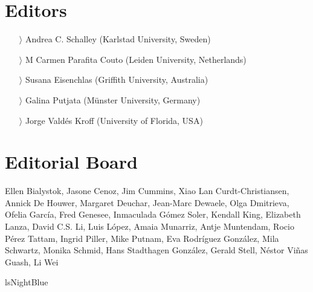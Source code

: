 \documentclass[
notumble,
nofoldmark,
]{leaflet}
\begin{document}
 \color{lsNightBlue} 
{
\section{Editors}    
            
            
\begin{itemize}
    \item[$\rangle$] Andrea C. Schalley (Karlstad University, Sweden) 
    \item[$\rangle$] M Carmen Parafita Couto   (Leiden University, Netherlands) 
    \item[$\rangle$]Susana Eisenchlas (Griffith University, Australia)
    \item[$\rangle$]Galina Putjata (Münster University, Germany)
    \item[$\rangle$]Jorge Valdés Kroff (University of Florida, USA)
\end{itemize}
    \section{Editorial Board}    
\raggedright         
    Ellen Bialystok,
    Jasone Cenoz,
    Jim Cummins,
    Xiao Lan Curdt-Christiansen,
    Annick De Houwer,
    Margaret Deuchar,
    Jean-Marc Dewaele,
    Olga Dmitrieva,
    Ofelia García,
    Fred Genesee,
    Inmaculada Gómez Soler,
    Kendall King,
    Elizabeth Lanza,
    David C.S. Li,
    Luis López,
    Amaia Munarriz,
    Antje Muntendam,
    Rocio Pérez Tattam,
    Ingrid Piller,
    Mike Putnam,
    Eva Rodríguez González,
    Mila Schwartz,
    Monika Schmid,
    Hans Stadthagen González,
    Gerald Stell,
    Néstor Viñas Guash,
    Li Wei
}{lsNightBlue}
\end{document}
